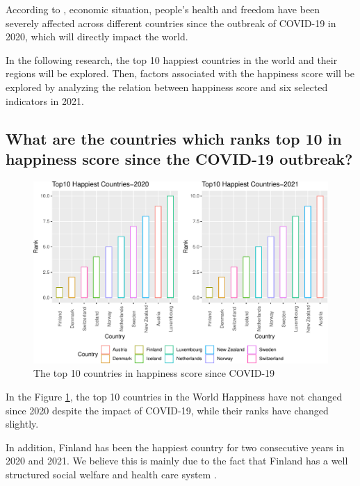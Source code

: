 \documentclass[11pt,a4paper,]{article}
\begin{document}
According to \textcite{helliwell2021world}, economic situation, people's health and freedom have been severely affected across different countries since the outbreak of COVID-19 in 2020, which will directly impact the world.

In the following research, the top 10 happiest countries in the world and their regions will be explored. Then, factors associated with the happiness score will be explored by analyzing the relation between happiness score and six selected indicators in 2021.

\hypertarget{what-are-the-countries-which-ranks-top-10-in-happiness-score-since-the-covid-19-outbreak}{%
\subsection{What are the countries which ranks top 10 in happiness score since the COVID-19 outbreak?}\label{what-are-the-countries-which-ranks-top-10-in-happiness-score-since-the-covid-19-outbreak}}

\begin{figure}
\centering
\includegraphics{Assignment4_files/figure-latex/top10-1.pdf}
\caption{\label{fig:top10}The top 10 countries in happiness score since COVID-19}
\end{figure}

In the Figure \ref{fig:top10}, the top 10 countries in the World Happiness have not changed since 2020 despite the impact of COVID-19, while their ranks have changed slightly.

In addition, Finland has been the happiest country for two consecutive years in 2020 and 2021. We believe this is mainly due to the fact that Finland has a well structured social welfare and health care system \autocite{lappi2006finland}.
\end{document}
